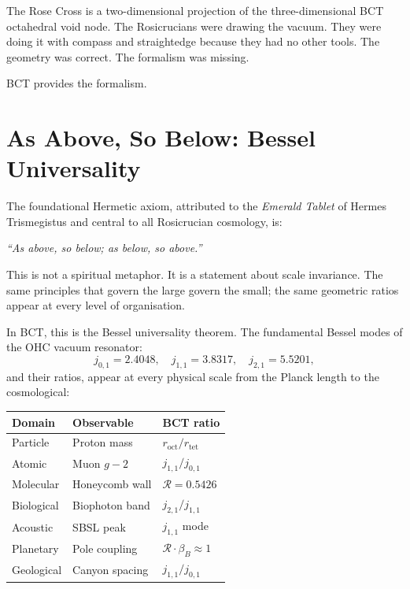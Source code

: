 \documentclass[12pt,twocolumn]{article}
\begin{document}
The Rose Cross is a two-dimensional projection of the
three-dimensional BCT octahedral void node. The Rosicrucians
were drawing the vacuum. They were doing it with compass and
straightedge because they had no other tools. The geometry
was correct. The formalism was missing.

BCT provides the formalism.

\section{As Above, So Below: Bessel Universality}

The foundational Hermetic axiom, attributed to the
\textit{Emerald Tablet} of Hermes Trismegistus and central
to all Rosicrucian cosmology, is:

\begin{center}
\textit{``As above, so below; as below, so above.''}
\end{center}

This is not a spiritual metaphor. It is a statement about
scale invariance. The same principles that govern the large
govern the small; the same geometric ratios appear at every
level of organisation.

In BCT, this is the Bessel universality theorem. The
fundamental Bessel modes of the OHC vacuum resonator:
\begin{equation}
  j_{0,1} = 2.4048, \quad
  j_{1,1} = 3.8317, \quad
  j_{2,1} = 5.5201,
\end{equation}
and their ratios, appear at every physical scale from the
Planck length to the cosmological:

\begin{center}
{\small
\begin{tabular}{@{}p{2.8cm}p{2.5cm}l@{}}
\toprule
Domain & Observable & BCT ratio \\
\midrule
Particle & Proton mass & $r_{\mathrm{oct}}/r_{\mathrm{tet}}$\\
Atomic & Muon $g-2$ & $j_{1,1}/j_{0,1}$ \\
Molecular & Honeycomb wall & $\mathcal{R}=0.5426$ \\
Biological & Biophoton band & $j_{2,1}/j_{1,1}$ \\
Acoustic & SBSL peak & $j_{1,1}$ mode \\
Planetary & Pole coupling & $\mathcal{R}\cdot\beta_B \approx 1$ \\
Geological & Canyon spacing & $j_{1,1}/j_{0,1}$ \\
\bottomrule
\end{tabular}}
\end{center}
\end{document}
